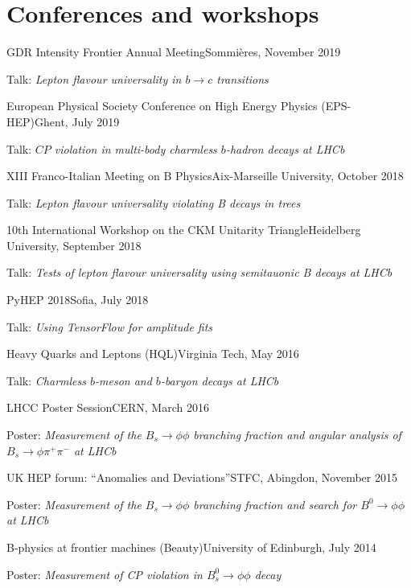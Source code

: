 \documentclass[contbibnum,titleabove]{simplecv}
\newcommand\dateditem[2]{\vspace{0.5em}#1\hfill#2\par}
\newcommand\topictitle[3]{\par\dateditem{#1}{#3}{\color{darkgray}#2}}
\begin{document}
	\section{Conferences and workshops}
	\topictitle{GDR Intensity Frontier Annual Meeting}{Talk: \textit{Lepton flavour universality in $b \to c$ transitions}}{Sommi\`eres, November 2019}
	\topictitle{European Physical Society Conference on High Energy Physics (EPS-HEP)}{Talk: \textit{$C\!P$ violation in multi-body charmless $b$-hadron decays at LHCb}}{Ghent, July 2019}
	\topictitle{XIII Franco-Italian Meeting on B Physics}{Talk: \textit{Lepton flavour universality violating B decays in trees}}{Aix-Marseille University, October 2018}
	\topictitle{10th International Workshop on the CKM Unitarity Triangle}{Talk: \textit{Tests of lepton flavour universality using semitauonic B decays at LHCb}}{Heidelberg University, September 2018}
	\topictitle{PyHEP 2018}{Talk: \textit{Using TensorFlow for amplitude fits}}{Sofia, July 2018}
	\topictitle{Heavy Quarks and Leptons (HQL)}{Talk: \textit{Charmless $b$-meson and $b$-baryon decays at LHCb}}{Virginia Tech, May 2016}
	\topictitle{LHCC Poster Session}{Poster: \textit{Measurement of the $B_s \to \phi \phi$ branching fraction and angular analysis of $B_s \to \phi \pi^{+} \pi^{-}$ at LHCb}}{CERN, March 2016}
	\topictitle{UK HEP forum: ``Anomalies and Deviations''}{Poster: \textit{Measurement of the $B_s \to \phi \phi$ branching fraction and search for $B^0 \to \phi \phi$ at LHCb}}{STFC, Abingdon, November 2015}
	\topictitle{B-physics at frontier machines (Beauty)}{Poster: \textit{Measurement of CP violation in $B^0_s \to \phi\phi$ decay}}{University of Edinburgh, July 2014}
\end{document}
